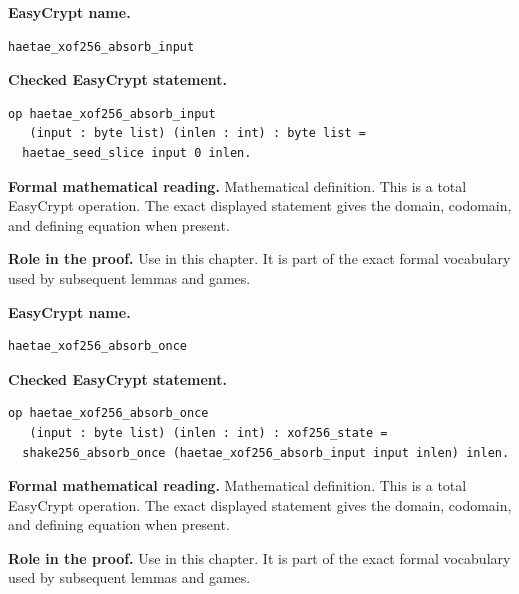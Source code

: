 \begin{formaldefinition}
\noindent\textbf{EasyCrypt name.}
\begin{lstlisting}[language=EasyCrypt,basicstyle=\ttfamily\scriptsize]
haetae_xof256_absorb_input
\end{lstlisting}
\noindent\textbf{Checked EasyCrypt statement.}
\begin{lstlisting}[language=EasyCrypt,basicstyle=\ttfamily\scriptsize]
op haetae_xof256_absorb_input
   (input : byte list) (inlen : int) : byte list =
  haetae_seed_slice input 0 inlen.
\end{lstlisting}
\noindent\textbf{Formal mathematical reading.}
Mathematical definition. This is a total EasyCrypt operation.  The exact displayed statement gives the domain, codomain, and defining equation when present.

\noindent\textbf{Role in the proof.}
Use in this chapter. It is part of the exact formal vocabulary used by subsequent lemmas and games.

\end{formaldefinition}

\begin{formaldefinition}
\noindent\textbf{EasyCrypt name.}
\begin{lstlisting}[language=EasyCrypt,basicstyle=\ttfamily\scriptsize]
haetae_xof256_absorb_once
\end{lstlisting}
\noindent\textbf{Checked EasyCrypt statement.}
\begin{lstlisting}[language=EasyCrypt,basicstyle=\ttfamily\scriptsize]
op haetae_xof256_absorb_once
   (input : byte list) (inlen : int) : xof256_state =
  shake256_absorb_once (haetae_xof256_absorb_input input inlen) inlen.
\end{lstlisting}
\noindent\textbf{Formal mathematical reading.}
Mathematical definition. This is a total EasyCrypt operation.  The exact displayed statement gives the domain, codomain, and defining equation when present.

\noindent\textbf{Role in the proof.}
Use in this chapter. It is part of the exact formal vocabulary used by subsequent lemmas and games.

\end{formaldefinition}

